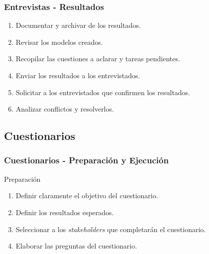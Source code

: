 \documentclass[a4paper,t,xcolor=pst,dvips,blue]{beamer}
\begin{document}
\begin{frame}[c]
    \frametitle{Entrevistas - Resultados}
    \begin{enumerate}[<+->]
        \item Documentar y archivar  de los resultados.
        \item Revisar los modelos creados.
        \item Recopilar las cuestiones a aclarar y tareas pendientes.
        \item Enviar los resultados a los entrevistados.
        \item Solicitar a los entrevistados que confirmen los resultados.
        \item Analizar conflictos y resolverlos.
    \end{enumerate}
\end{frame}

\subsection{Cuestionarios}

\begin{frame}[c]
	\frametitle{Cuestionarios - Preparación y Ejecución}
	\begin{block}{Preparación}
		\begin{enumerate}
			\item<1-> Definir claramente el objetivo del cuestionario.
			\item<2-> Definir los resultados esperados.
			\item<3-> Seleccionar a los \emph{stakeholders} que completarán el cuestionario.
			\item<4-> Elaborar las preguntas del cuestionario.
		\end{enumerate}
	\end{block}
\end{frame}
\end{document}
